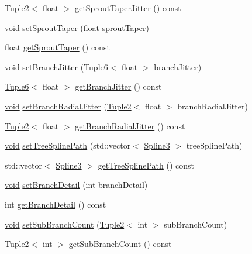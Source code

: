 \begin{DoxyCompactItemize}
\item 
\hyperlink{class_tuple2}{Tuple2}$<$ float $>$ \hyperlink{class_tree_a9d776009fc0dd77f4e12cbbfba539a7a}{get\-Sprout\-Taper\-Jitter} () const 
\item 
\hyperlink{glutf90_8h_ac778d6f63f1aaf8ebda0ce6ac821b56e}{void} \hyperlink{class_tree_a7d07632f883e80f1c59c59dd81753791}{set\-Sprout\-Taper} (float sprout\-Taper)
\item 
float \hyperlink{class_tree_ae6633bd780ecef9fcf62f33014ca5289}{get\-Sprout\-Taper} () const 
\item 
\hyperlink{glutf90_8h_ac778d6f63f1aaf8ebda0ce6ac821b56e}{void} \hyperlink{class_tree_a1132920d1c79ffbe0cf7bde260c681ea}{set\-Branch\-Jitter} (\hyperlink{class_tuple6}{Tuple6}$<$ float $>$ branch\-Jitter)
\item 
\hyperlink{class_tuple6}{Tuple6}$<$ float $>$ \hyperlink{class_tree_ac25bd9ef029c3e52b37774b88775d50f}{get\-Branch\-Jitter} () const 
\item 
\hyperlink{glutf90_8h_ac778d6f63f1aaf8ebda0ce6ac821b56e}{void} \hyperlink{class_tree_a540b5f868d3faa6bf2e9dad39fce3c9b}{set\-Branch\-Radial\-Jitter} (\hyperlink{class_tuple2}{Tuple2}$<$ float $>$ branch\-Radial\-Jitter)
\item 
\hyperlink{class_tuple2}{Tuple2}$<$ float $>$ \hyperlink{class_tree_a01789c47b05843bd71672cf5b97ee24a}{get\-Branch\-Radial\-Jitter} () const 
\item 
\hyperlink{glutf90_8h_ac778d6f63f1aaf8ebda0ce6ac821b56e}{void} \hyperlink{class_tree_a11bac68ee2ba2f5a3d69520b2cf40022}{set\-Tree\-Spline\-Path} (std\-::vector$<$ \hyperlink{class_spline3}{Spline3} $>$ tree\-Spline\-Path)
\item 
std\-::vector$<$ \hyperlink{class_spline3}{Spline3} $>$ \hyperlink{class_tree_ab13b3a2b754c10594c34cb0b221cda5b}{get\-Tree\-Spline\-Path} () const 
\item 
\hyperlink{glutf90_8h_ac778d6f63f1aaf8ebda0ce6ac821b56e}{void} \hyperlink{class_tree_a4c1e5509eb34a40581e59db8ea61a3b9}{set\-Branch\-Detail} (int branch\-Detail)
\item 
int \hyperlink{class_tree_a7ed8f5af55f33e9ad69cf9dc1388e850}{get\-Branch\-Detail} () const 
\item 
\hyperlink{glutf90_8h_ac778d6f63f1aaf8ebda0ce6ac821b56e}{void} \hyperlink{class_tree_ab6b0388beca15cfbfdf2b092decc4570}{set\-Sub\-Branch\-Count} (\hyperlink{class_tuple2}{Tuple2}$<$ int $>$ sub\-Branch\-Count)
\item 
\hyperlink{class_tuple2}{Tuple2}$<$ int $>$ \hyperlink{class_tree_ad10d3008d8ec5b4bf048dbe83e8448df}{get\-Sub\-Branch\-Count} () const 

\end{DoxyCompactItemize}
